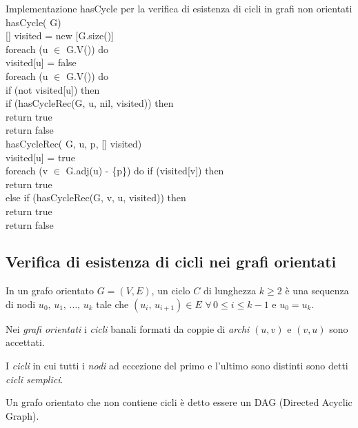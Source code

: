 \begin{code}{Implementazione hasCycle per la verifica di esistenza di
    cicli in grafi non orientati}
\noindent\rmbreak\ind{} hasCycle( G)\\
    [] visited = new [G.size()]\\
    foreach (u $\in$ G.V()) do\\
        \indf visited[u] = false\\
    \ind foreach (u $\in$ G.V()) do\\
        \indf if (not visited[u]) then\\
            \indff if (hasCycleRec(G, u, nil, visited)) then\\
                \indfff return true\\
    \ind return false\\

\noindent{}
\rmbreak\ind{} hasCycleRec( G,  u,  p, [] visited)\\
    visited[u] = true\\
    foreach (v $\in$ G.adj(u) - \{p\}) do\hfill{}
        \indf if (visited[v]) then\\
            \indff return true\\
        \indf else if (hasCycleRec(G, v, u, visited)) then\\
            \indff return true\\
    \ind return false
\end{code}

\subsection{Verifica di esistenza di cicli nei grafi orientati}
\begin{definition}
    In un grafo orientato $G=(V,E)$, un ciclo $C$ di lunghezza $k\geq 2$ è
    una sequenza di nodi $u_0,\,u_1,\,\dots,\,u_k$ tale che $(u_i,\,u_{i+1})\in E$
    $\forall\,0\leq i\leq k-1$ e $u_0=u_k$.
\end{definition}
\begin{note}
    Nei \emph{grafi orientati} i \emph{cicli} banali formati da coppie di
    \emph{archi} $(u,v)$ e $(v,u)$ sono accettati.
\end{note}
\begin{note}
    I \emph{cicli} in cui tutti i \emph{nodi} ad eccezione del primo e l'ultimo
    sono distinti sono detti \emph{cicli semplici}.
\end{note}
\begin{definition}
    Un grafo orientato che non contiene cicli è detto essere un DAG (Directed
    Acyclic Graph).
\end{definition}

